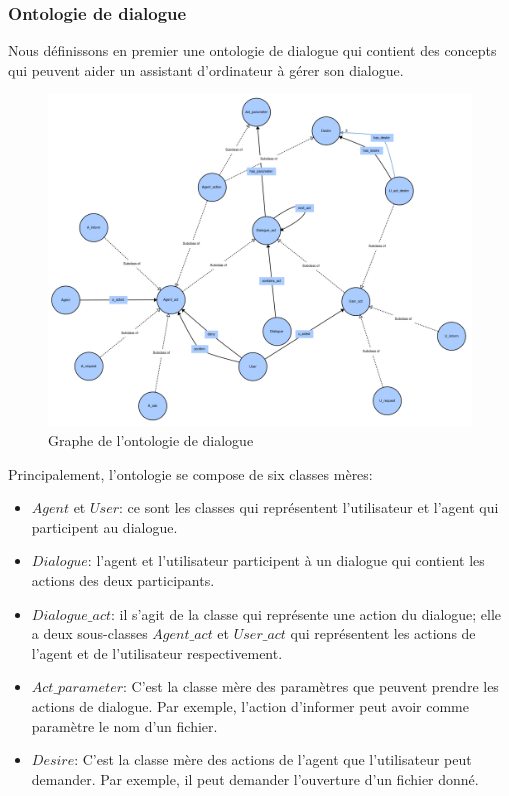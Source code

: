 \subsubsection{Ontologie de dialogue}\label{onto1}
Nous définissons en premier une ontologie de dialogue qui contient des concepts qui peuvent aider un assistant d'ordinateur à gérer son dialogue.
\begin{figure}[H] 
	
	\centering
	\includegraphics[width=1.1\linewidth]{images/Conception/DM/main_onto.png}
	\caption{Graphe de l'ontologie de dialogue}
\end{figure}\label{mail_onto}
Principalement, l'ontologie se compose de six classes mères:
\begin{itemize}
	\item $Agent$ et $User$: ce sont les classes qui représentent l'utilisateur et l'agent qui participent au dialogue.
	\item $Dialogue$: l'agent et l'utilisateur participent à un dialogue qui contient les actions des deux participants.
	\item $Dialogue\_act$: il s'agit de la classe qui représente une action du dialogue; elle a deux sous-classes $Agent\_act$ et $User\_act$ qui représentent les actions de l'agent et de l'utilisateur respectivement.
	\item $Act\_parameter$: C'est la classe mère des paramètres que peuvent prendre les actions de dialogue. Par exemple, l'action d'informer peut avoir comme paramètre le nom d'un fichier.
	\item $Desire$: C'est la classe mère des actions de l'agent que l'utilisateur peut demander. Par exemple, il peut demander l'ouverture d'un fichier donné.
\end{itemize}
